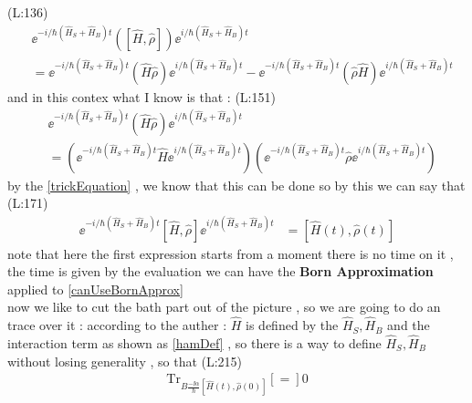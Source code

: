 (L:136)
\begin{equation}
\begin{split}
&\ee ^{-i /\hbar (\hat{H }_{S }+\hat{H }_{B })t }\left(\left[\hat{H },\hat{\rho }\right]\right)\ee ^{i /\hbar (\hat{H }_{S }+\hat{H }_{B })t }\\
&=\ee ^{-i /\hbar (\hat{H }_{S }+\hat{H }_{B })t }\left(\hat{H }\hat{\rho }\right)\ee ^{i /\hbar (\hat{H }_{S }+\hat{H }_{B })t }-\ee ^{-i /\hbar (\hat{H }_{S }+\hat{H }_{B })t }\left(\hat{\rho }\hat{H }\right)\ee ^{i /\hbar (\hat{H }_{S }+\hat{H }_{B })t }\end{split}
\end{equation}
 and in this contex what I know is that  :
(L:151)
\begin{equation}
\begin{split}
\label{trickEquation}&\ee ^{-i /\hbar (\hat{H }_{S }+\hat{H }_{B })t }\left(\hat{H }\hat{\rho }\right)\ee ^{i /\hbar (\hat{H }_{S }+\hat{H }_{B })t }\\
&=\left(\ee ^{-i /\hbar (\hat{H }_{S }+\hat{H }_{B })t }\hat{H }\ee ^{i /\hbar (\hat{H }_{S }+\hat{H }_{B })t }\right)\left(\ee ^{-i /\hbar (\hat{H }_{S }+\hat{H }_{B })t }\hat{\rho }\ee ^{i /\hbar (\hat{H }_{S }+\hat{H }_{B })t }\right)\end{split}
\end{equation}
 by the \eqref{trickEquation} , we know that this can be done so by this we can say that  
(L:171)
\begin{equation}
\begin{split}
\ee ^{-i /\hbar (\hat{H }_{S }+\hat{H }_{B })t }\left[\hat{H },\hat{\rho }\right]\ee ^{i /\hbar (\hat{H }_{S }+\hat{H }_{B })t }&=\left[\hat{H }(t ),\hat{\rho }(t )\right]\end{split}
\end{equation}
 note that here the first expression starts from 
 a moment there is no time on it , 
 the time is given by the evaluation
 we can have the \textbf{Born Approximation} applied to \eqref{canUseBornApprox} \\ 
 now we like to cut the bath part out of the picture	 , so we are going to do an trace over it :
 according to the auther : 
 $ \hat{H } $  is defined by the 
 $ \hat{H }_{S },\hat{H }_{B } $  and the interaction term as shown as
 \eqref{hamDef} , so there is a way to define 
 $ \hat{H }_{S },\hat{H }_{B } $  without losing generality , so that
(L:215)
\begin{equation}
\begin{split}
\text{Tr}_{B \frac{-\ii \alpha }{\hbar }\left[\hat{H }(t ),\hat{\rho }(0)\right]}\left[=\right]0\end{split}
\end{equation}
